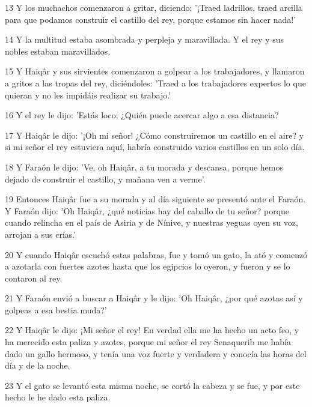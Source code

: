 \par 13 Y los muchachos comenzaron a gritar, diciendo: '¡Traed ladrillos, traed arcilla para que podamos construir el castillo del rey, porque estamos sin hacer nada!'

\par 14 Y la multitud estaba asombrada y perpleja y maravillada. Y el rey y sus nobles estaban maravillados.

\par 15 Y Haiqâr y sus sirvientes comenzaron a golpear a los trabajadores, y llamaron a gritos a las tropas del rey, diciéndoles: 'Traed a los trabajadores expertos lo que quieran y no les impidáis realizar su trabajo.'

\par 16 Y el rey le dijo: 'Estás loco; ¿Quién puede acercar algo a esa distancia?

\par 17 Y Haiqâr le dijo: '¡Oh mi señor! ¿Cómo construiremos un castillo en el aire? y si mi señor el rey estuviera aquí, habría construido varios castillos en un solo día.

\par 18 Y Faraón le dijo: 'Ve, oh Haiqâr, a tu morada y descansa, porque hemos dejado de construir el castillo, y mañana ven a verme'.

\par 19 Entonces Haiqâr fue a su morada y al día siguiente se presentó ante el Faraón. Y Faraón dijo: 'Oh Haiqâr, ¿qué noticias hay del caballo de tu señor? porque cuando relincha en el país de Asiria y de Nínive, y nuestras yeguas oyen su voz, arrojan a sus crías.'

\par 20 Y cuando Haiqâr escuchó estas palabras, fue y tomó un gato, la ató y comenzó a azotarla con fuertes azotes hasta que los egipcios lo oyeron, y fueron y se lo contaron al rey.

\par 21 Y Faraón envió a buscar a Haiqâr y le dijo: 'Oh Haiqâr, ¿por qué azotas así y golpeas a esa bestia muda?'

\par 22 Y Haiqâr le dijo: ¡Mi señor el rey! En verdad ella me ha hecho un acto feo, y ha merecido esta paliza y azotes, porque mi señor el rey Senaquerib me había dado un gallo hermoso, y tenía una voz fuerte y verdadera y conocía las horas del día y de la noche.

\par 23 Y el gato se levantó esta misma noche, se cortó la cabeza y se fue, y por este hecho le he dado esta paliza.

